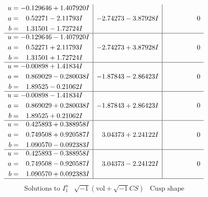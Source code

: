 \documentclass[1p]{elsarticle_modified}
\theoremstyle{definition}
\newcommand{\I}{\sqrt{-1}}
\begin{document}
$$\begin{array}{c|c|c}
\begin{aligned}
u &= -0.129646 + 1.407920 I \\
a &= \phantom{-}0.52271 - 2.11793 I \\
b &= \phantom{-}1.31501 - 1.72724 I\end{aligned}
 & -2.74273 - 3.87928 I & \phantom{-0.000000 } 0 \\ \hline\begin{aligned}
u &= -0.129646 - 1.407920 I \\
a &= \phantom{-}0.52271 + 2.11793 I \\
b &= \phantom{-}1.31501 + 1.72724 I\end{aligned}
 & -2.74273 + 3.87928 I & \phantom{-0.000000 } 0 \\ \hline\begin{aligned}
u &= -0.00898 + 1.41834 I \\
a &= \phantom{-}0.869029 - 0.280038 I \\
b &= \phantom{-}1.89525 - 0.21062 I\end{aligned}
 & -1.87843 - 2.86423 I & \phantom{-0.000000 } 0 \\ \hline\begin{aligned}
u &= -0.00898 - 1.41834 I \\
a &= \phantom{-}0.869029 + 0.280038 I \\
b &= \phantom{-}1.89525 + 0.21062 I\end{aligned}
 & -1.87843 + 2.86423 I & \phantom{-0.000000 } 0 \\ \hline\begin{aligned}
u &= \phantom{-}0.425893 + 0.388958 I \\
a &= \phantom{-}0.749508 + 0.920587 I \\
b &= \phantom{-}1.090570 - 0.092383 I\end{aligned}
 & \phantom{-}3.04373 + 2.24122 I & \phantom{-0.000000 } 0 \\ \hline\begin{aligned}
u &= \phantom{-}0.425893 - 0.388958 I \\
a &= \phantom{-}0.749508 - 0.920587 I \\
b &= \phantom{-}1.090570 + 0.092383 I\end{aligned}
 & \phantom{-}3.04373 - 2.24122 I & \phantom{-0.000000 } 0\\
 \hline 
 \end{array}$$\newpage$$\begin{array}{c|c|c}  
\text{Solutions to }I^u_{1}& \I (\text{vol} + \sqrt{-1}CS) & \text{Cusp shape}\\

\end{array}$$
\end{document}
